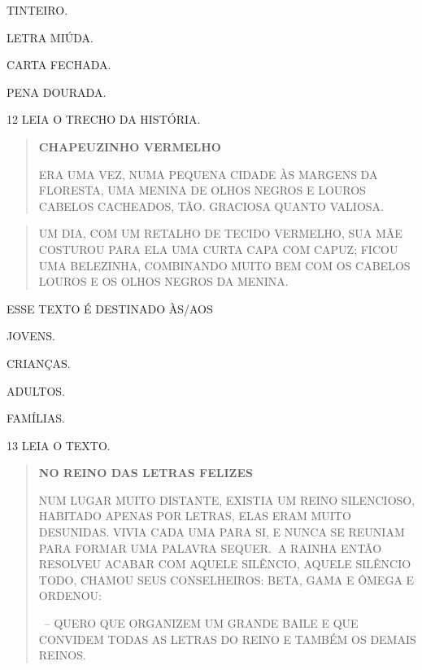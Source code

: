 \begin{escolha}
\item TINTEIRO.

\item LETRA MIÚDA.

\item CARTA FECHADA.

\item PENA DOURADA.
\end{escolha}


\num{12} LEIA O TRECHO DA HISTÓRIA.

\begin{quote}
\textbf{CHAPEUZINHO VERMELHO}

ERA UMA VEZ, NUMA PEQUENA CIDADE ÀS MARGENS DA FLORESTA,
UMA MENINA DE OLHOS NEGROS E LOUROS CABELOS CACHEADOS, TÃO.
GRACIOSA QUANTO VALIOSA.
\end{quote}

\begin{quote}
UM DIA, COM UM RETALHO DE TECIDO VERMELHO, SUA MÃE
COSTUROU PARA ELA UMA CURTA CAPA COM CAPUZ; FICOU UMA
BELEZINHA, COMBINANDO MUITO BEM COM OS CABELOS LOUROS E
OS OLHOS NEGROS DA MENINA.

\end{quote}

ESSE TEXTO É DESTINADO ÀS/AOS 

\begin{escolha}
\item JOVENS.

\item CRIANÇAS.

\item ADULTOS.

\item FAMÍLIAS.
\end{escolha}

\num{13} LEIA O TEXTO.

\begin{quote}
\textbf{NO REINO DAS LETRAS FELIZES}

NUM LUGAR MUITO DISTANTE, EXISTIA UM REINO SILENCIOSO, HABITADO APENAS
POR LETRAS, ELAS ERAM MUITO DESUNIDAS. VIVIA CADA UMA PARA SI, E NUNCA
SE REUNIAM PARA FORMAR UMA PALAVRA SEQUER.\textbf{~}A RAINHA ENTÃO
RESOLVEU ACABAR COM AQUELE SILÊNCIO, AQUELE SILÊNCIO TODO, CHAMOU SEUS
CONSELHEIROS: BETA, GAMA E ÔMEGA E ORDENOU:

~-- QUERO QUE ORGANIZEM UM GRANDE BAILE E QUE CONVIDEM TODAS AS LETRAS
DO REINO E TAMBÉM OS DEMAIS REINOS.
\end{quote}

